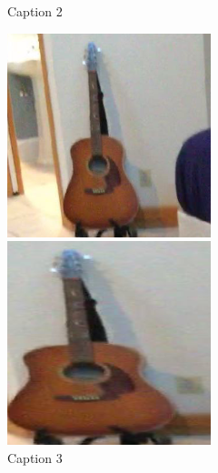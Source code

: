 \begin{figure}[h!]
\begin{minipage}[b]{0.1\textwidth}
        \caption{Caption 2}
    \end{minipage}
    \vspace{0em} %
    \begin{minipage}[b]{0.1\textwidth}
        \centering
        \includegraphics[width=\textwidth]{images/cropping_method_2.png}
        \caption{Caption 3}
    \end{minipage}
    \hspace{1em} %
    \begin{minipage}[b]{0.1\textwidth}
        \centering
        \includegraphics[width=\textwidth]{images/cropping_method_3.png}

\end{minipage}
\end{figure}
